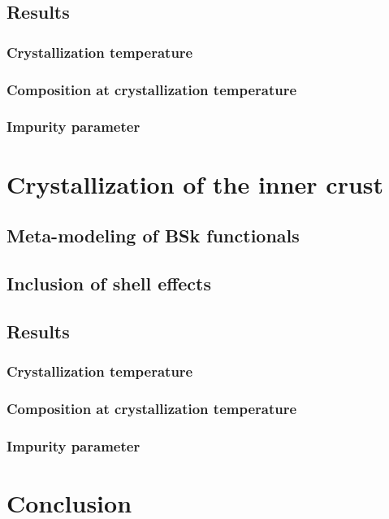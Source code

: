 \subsection{Results}

\subsubsection{Crystallization temperature}

\subsubsection{Composition at crystallization temperature}

\subsubsection{Impurity parameter}

\section{Crystallization of the inner crust}

\subsection{Meta-modeling of BSk functionals}

\subsection{Inclusion of shell effects}

\subsection{Results}

\subsubsection{Crystallization temperature}

\subsubsection{Composition at crystallization temperature}

\subsubsection{Impurity parameter}

\section{Conclusion}
